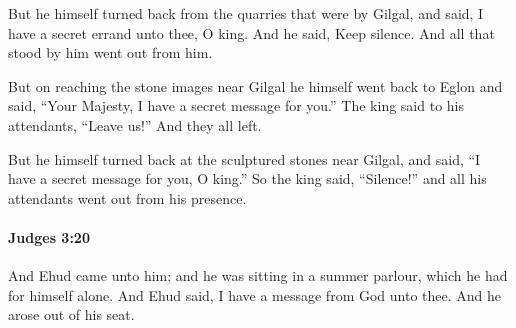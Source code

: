 			\begin{versebox}
					\item[BHS] 
					\item[ASV] But he himself turned back from the quarries that were by Gilgal, and said, I have a secret errand unto thee, O king. And he said, Keep silence. And all that stood by him went out from him.
					\item[NIV] But on reaching the stone images near Gilgal he himself went back to Eglon and said, “Your Majesty, I have a secret message for you.” The king said to his attendants, “Leave us!” And they all left.
					\item[NRSV] But he himself turned back at the sculptured stones near Gilgal, and said, “I have a secret message for you, O king.” So the king said, “Silence!” and all his attendants went out from his presence.
			\end{versebox}

		\paragraph{Judges 3:20} %
			\label{JUDGES-3-20}

			And Ehud came unto him; and he was sitting in a summer parlour, which he had for himself alone. And Ehud said, I have a message from God unto thee. And he arose out of his seat.

